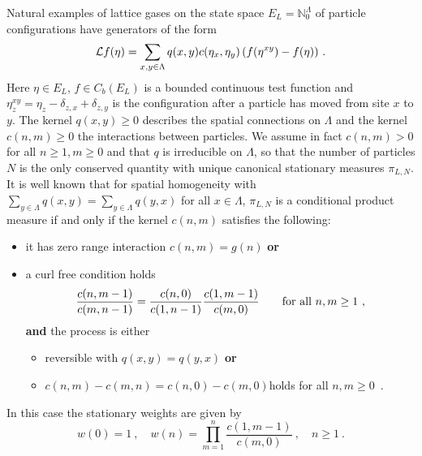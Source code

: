 \documentclass[pdflatex,sn-mathphys-num]{sn-jnl}%
\theoremstyle{thmstyleone}%
\theoremstyle{thmstyletwo}%
\theoremstyle{thmstylethree}%
\begin{document}
Natural examples of lattice gases on the state space $E_L =\mathbb{N}_0^\Lambda$ of particle configurations have generators of the form\vspace*{-2mm}
\begin{equation}
	\begin{aligned}
		\mathcal{L}f(\eta) = \sum_{x,y \in \Lambda} q(x,y) c(\eta_x, \eta_y) \left( f(\eta^{x y}) - f(\eta)\right) \, .
		\label{eq_generator}
	\end{aligned}\vspace*{-2mm}
\end{equation}
Here $\eta \in E_L$, $f \in C_b(E_L )$ is a bounded continuous test function and $\eta^{x y}_z = \eta_z -\delta_{z,x}+\delta_{z,y}$ is the configuration after a particle has moved from site $x$ to $y$. The kernel $q(x,y)\geq 0$ describes the spatial connections on $\Lambda$ and the kernel $c(n,m)\geq 0$ the interactions between particles. We assume in fact $c(n,m)>0$ for all $n\geq 1,m\geq 0$ and that $q$ is irreducible on $\Lambda$, so that the number of particles $N$ is the only conserved quantity with unique canonical stationary measures $\pi_{L,N}$. It is well known \cite{bib_C85,Saada2016} that for spatial homogeneity with $\sum_{y\in\Lambda} q(x,y)=\sum_{y\in\Lambda} q(y,x)$ for all $x\in\Lambda$, $\pi_{L,N}$ is a conditional product measure if and only if the kernel $c(n,m)$ satisfies the following:
	\begin{itemize}
		\item it has zero range interaction $c(n,m) = g(n)$ \hspace{3pt} \textbf{or}
		\item a curl free condition holds
		\begin{equation}
			\frac{c(n,m-1)}{c(m,n-1)} = \frac{c(n, 0)}{c(1, n-1)}\frac{c(1,m-1)}{c(m,0)} \qquad \text{for all } n,m \geq 1\ ,
			\label{eq_curl_free}\vspace*{-2mm}
		\end{equation}
		\textbf{and} the process is either 
		\begin{itemize}
			\item reversible with $q(x,y) = q(y, x)$ \hspace{3pt} \textbf{or}
			\item %
            $c(n,m) - c(m,n) = c(n,0) - c(m,0)$\quad holds for all $n,m\geq 0$\ .
		\end{itemize}
	\end{itemize}
In this case the stationary weights are given by
\begin{equation}\label{statw}
    w(0)=1\ ,\quad w(n) = \prod^n_{m=1} \frac{c(1, m-1)}{c(m,0)}\ ,\quad n\geq 1\ .
\end{equation}
\end{document}
